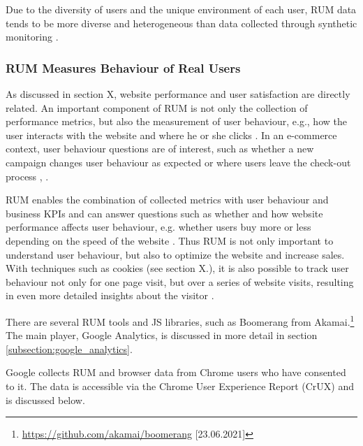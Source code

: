 Due to the diversity of users and the unique environment of each user, RUM data tends to be more diverse and heterogeneous than data collected through synthetic monitoring \cite{2013Meenan}.


\subsubsection{RUM Measures Behaviour of Real Users} %


As discussed in section X, website performance and user satisfaction are directly related.
An important component of RUM is not only the collection of performance metrics, but also the measurement of user behaviour, e.g., how the user interacts with the website and where he or she clicks \cite{2021Wingerath}.
In an e-commerce context, user behaviour questions are of interest, such as whether a new campaign changes user behaviour as expected or where users leave the check-out process \cite{2021Wingerath}, \cite{2021MDNRUMvsSynthetic}.

RUM enables the combination of collected metrics with user behaviour and business KPIs and can answer questions such as whether and how website performance affects user behaviour, e.g. whether users buy more or less depending on the speed of the website \cite{2021Eggplant}.
Thus RUM is not only important to understand user behaviour, but also to optimize the website and increase sales.
With techniques such as cookies (see section X.), it is also possible to track user behaviour not only for one page visit, but over a series of website visits, resulting in even more detailed insights about the visitor \cite{2021Wingerath}.


There are several RUM tools and JS libraries, such as Boomerang from Akamai.\footnote{\url{https://github.com/akamai/boomerang} [23.06.2021]}
The main player, Google Analytics, is discussed in more detail in section \ref{subsection:google_analytics}.



Google collects RUM and browser data from Chrome users who have consented to it.
The data is accessible via the Chrome User Experience Report (CrUX) and is discussed below.





